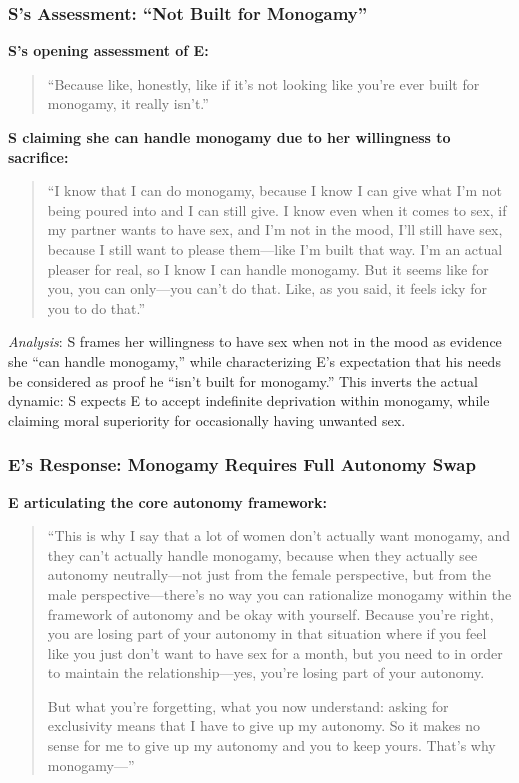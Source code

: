\documentclass[12pt, letterpaper]{article}
\begin{document}
\subsubsection{S's Assessment: ``Not Built for Monogamy''}

\textbf{S's opening assessment of E:}
\begin{quote}
``Because like, honestly, like if it's not looking like you're ever built for monogamy, it really isn't.''
\end{quote}

\textbf{S claiming she can handle monogamy due to her willingness to sacrifice:}
\begin{quote}
``I know that I can do monogamy, because I know I can give what I'm not being poured into and I can still give. I know even when it comes to sex, if my partner wants to have sex, and I'm not in the mood, I'll still have sex, because I still want to please them---like I'm built that way. I'm an actual pleaser for real, so I know I can handle monogamy. But it seems like for you, you can only---you can't do that. Like, as you said, it feels icky for you to do that.''
\end{quote}

\textit{Analysis}: S frames her willingness to have sex when not in the mood as evidence she ``can handle monogamy,'' while characterizing E's expectation that his needs be considered as proof he ``isn't built for monogamy.'' This inverts the actual dynamic: S expects E to accept indefinite deprivation within monogamy, while claiming moral superiority for occasionally having unwanted sex.

\subsubsection{E's Response: Monogamy Requires Full Autonomy Swap}

\textbf{E articulating the core autonomy framework:}
\begin{quote}
``This is why I say that a lot of women don't actually want monogamy, and they can't actually handle monogamy, because when they actually see autonomy neutrally---not just from the female perspective, but from the male perspective---there's no way you can rationalize monogamy within the framework of autonomy and be okay with yourself. Because you're right, you are losing part of your autonomy in that situation where if you feel like you just don't want to have sex for a month, but you need to in order to maintain the relationship---yes, you're losing part of your autonomy.

But what you're forgetting, what you now understand: asking for exclusivity means that I have to give up my autonomy. So it makes no sense for me to give up my autonomy and you to keep yours. That's why monogamy---''
\end{quote}
\end{document}
